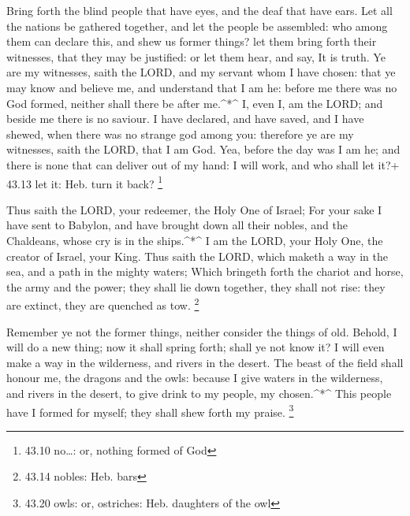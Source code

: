  Bring forth the blind people that have eyes, and the deaf
that have ears.  Let all the nations be gathered together,
and let the people be assembled: who among them can declare this, and
shew us former things? let them bring forth their witnesses, that they
may be justified: or let them hear, and say, It is truth. 
Ye are my witnesses, saith the LORD, and my servant whom I have chosen:
that ye may know and believe me, and understand that I am he: before me
there was no God formed, neither shall there be after me.\^{}*\^{}
 I, even I, am the LORD; and beside me there is no saviour.
 I have declared, and have saved, and I have shewed, when
there was no strange god among you: therefore ye are my witnesses, saith
the LORD, that I am God.  Yea, before the day was I am he;
and there is none that can deliver out of my hand: I will work, and who
shall let it?+ 43.13 let it: Heb. turn it back? \footnote{43.10
  no\ldots: or, nothing formed of God}

 Thus saith the LORD, your redeemer, the Holy One of
Israel; For your sake I have sent to Babylon, and have brought down all
their nobles, and the Chaldeans, whose cry is in the ships.\^{}*\^{}
 I am the LORD, your Holy One, the creator of Israel, your
King.  Thus saith the LORD, which maketh a way in the sea,
and a path in the mighty waters;  Which bringeth forth the
chariot and horse, the army and the power; they shall lie down together,
they shall not rise: they are extinct, they are quenched as tow.
\footnote{43.14 nobles: Heb. bars}

 Remember ye not the former things, neither consider the
things of old.  Behold, I will do a new thing; now it shall
spring forth; shall ye not know it? I will even make a way in the
wilderness, and rivers in the desert.  The beast of the
field shall honour me, the dragons and the owls: because I give waters
in the wilderness, and rivers in the desert, to give drink to my people,
my chosen.\^{}*\^{}  This people have I formed for myself;
they shall shew forth my praise. \footnote{43.20 owls: or, ostriches:
  Heb. daughters of the owl}

